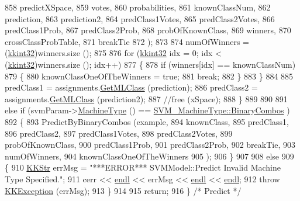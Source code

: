 \begin{DoxyCode}
858                      predictXSpace, 
859                      votes,
860                      probabilities, 
861                      knownClassNum,
862                      prediction,
863                      prediction2,
864                      predClass1Votes,
865                      predClass2Votes,
866                      predClass1Prob,
867                      predClass2Prob,
868                      probOfKnownClass,
869                      winners,
870                      crossClassProbTable,
871                      breakTie
872                     );
873 
874     numOfWinners = (\hyperlink{namespace_k_k_b_a8fa4952cc84fda1de4bec1fbdd8d5b1b}{kkint32})winners.size ();
875 
876     \textcolor{keywordflow}{for}  (\hyperlink{namespace_k_k_b_a8fa4952cc84fda1de4bec1fbdd8d5b1b}{kkint32} idx = 0;  idx < (\hyperlink{namespace_k_k_b_a8fa4952cc84fda1de4bec1fbdd8d5b1b}{kkint32})winners.size ();  idx++)
877     \{
878       \textcolor{keywordflow}{if}  (winners[idx] == knownClassNum)
879       \{
880         knownClassOneOfTheWinners = \textcolor{keyword}{true};
881         \textcolor{keywordflow}{break};
882       \}
883     \}
884 
885     predClass1 = assignments.\hyperlink{class_k_k_m_l_l_1_1_class_assignments_a1e6deee5eda8bf069953b65f6a0ef187}{GetMLClass} (prediction);
886     predClass2 = assignments.\hyperlink{class_k_k_m_l_l_1_1_class_assignments_a1e6deee5eda8bf069953b65f6a0ef187}{GetMLClass} (prediction2);
887     \textcolor{comment}{//free (xSpace);}
888   \}
889 
890   
891   \textcolor{keywordflow}{else} \textcolor{keywordflow}{if}  (svmParam->\hyperlink{class_k_k_m_l_l_1_1_s_v_mparam_a30153e00007f9cf65343e0ad97ad61fb}{MachineType} () == \hyperlink{namespace_k_k_m_l_l_ad917464bc631109a3021cf02cd27af9aa01ad67463554c5f5552dcc6b5f4a553f}{SVM\_MachineType::BinaryCombos}
      )
892   \{
893     PredictByBinaryCombos (example, 
894                            knownClass,
895                            predClass1,
896                            predClass2,
897                            predClass1Votes,
898                            predClass2Votes,
899                            probOfKnownClass,
900                            predClass1Prob,
901                            predClass2Prob,
902                            breakTie,
903                            numOfWinners,
904                            knownClassOneOfTheWinners
905                           );
906   \}
907     
908   \textcolor{keywordflow}{else}
909   \{
910     \hyperlink{class_k_k_b_1_1_k_k_str}{KKStr}  errMsg = \textcolor{stringliteral}{"***ERROR*** SVMModel::Predict   Invalid Machine Type Specified."};
911     cerr << \hyperlink{namespace_k_k_b_ad1f50f65af6adc8fa9e6f62d007818a8}{endl} << errMsg << \hyperlink{namespace_k_k_b_ad1f50f65af6adc8fa9e6f62d007818a8}{endl} << \hyperlink{namespace_k_k_b_ad1f50f65af6adc8fa9e6f62d007818a8}{endl};
912     \textcolor{keywordflow}{throw} \hyperlink{class_k_k_b_1_1_k_k_exception}{KKException} (errMsg);
913   \}
914 
915   \textcolor{keywordflow}{return};
916 \}  \textcolor{comment}{/* Predict */}
\end{DoxyCode}
